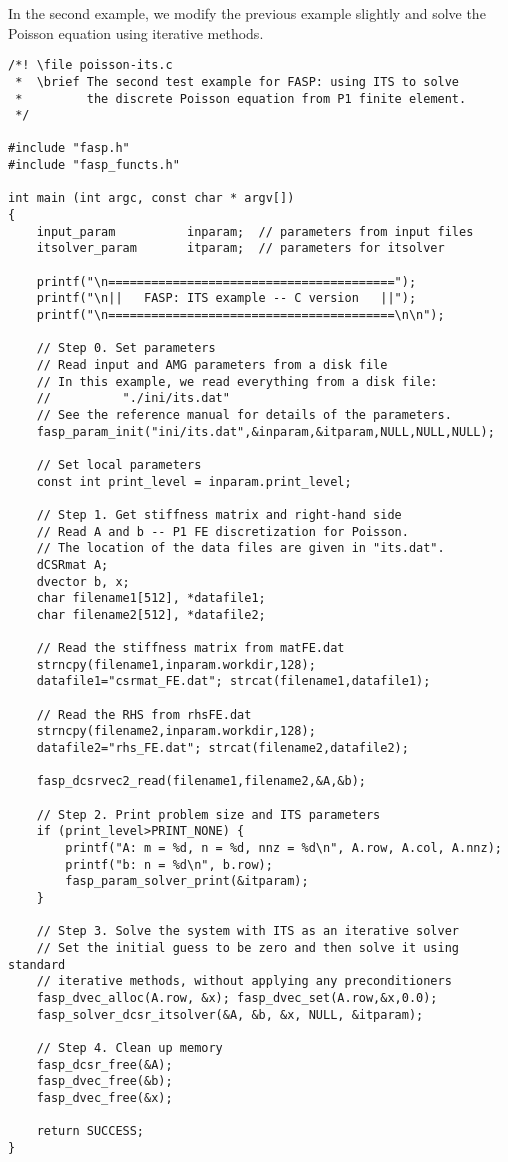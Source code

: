 \documentclass[11pt]{memoir}
\begin{document}
In the second example, we modify the previous example slightly and solve the Poisson equation using iterative methods.

\begin{lstlisting}[stepnumber=1,firstnumber=1]
/*! \file poisson-its.c
 *  \brief The second test example for FASP: using ITS to solve
 *         the discrete Poisson equation from P1 finite element.
 */

#include "fasp.h"
#include "fasp_functs.h"

int main (int argc, const char * argv[])
{
    input_param          inparam;  // parameters from input files
    itsolver_param       itparam;  // parameters for itsolver

    printf("\n========================================");
    printf("\n||   FASP: ITS example -- C version   ||");
    printf("\n========================================\n\n");

    // Step 0. Set parameters
    // Read input and AMG parameters from a disk file
    // In this example, we read everything from a disk file:
    //          "./ini/its.dat"
    // See the reference manual for details of the parameters.
    fasp_param_init("ini/its.dat",&inparam,&itparam,NULL,NULL,NULL);

    // Set local parameters
    const int print_level = inparam.print_level;

    // Step 1. Get stiffness matrix and right-hand side
    // Read A and b -- P1 FE discretization for Poisson.
    // The location of the data files are given in "its.dat".
    dCSRmat A;
    dvector b, x;
    char filename1[512], *datafile1;
    char filename2[512], *datafile2;

    // Read the stiffness matrix from matFE.dat
    strncpy(filename1,inparam.workdir,128);
    datafile1="csrmat_FE.dat"; strcat(filename1,datafile1);

    // Read the RHS from rhsFE.dat
    strncpy(filename2,inparam.workdir,128);
    datafile2="rhs_FE.dat"; strcat(filename2,datafile2);

    fasp_dcsrvec2_read(filename1,filename2,&A,&b);

    // Step 2. Print problem size and ITS parameters
    if (print_level>PRINT_NONE) {
        printf("A: m = %d, n = %d, nnz = %d\n", A.row, A.col, A.nnz);
        printf("b: n = %d\n", b.row);
        fasp_param_solver_print(&itparam);
    }

    // Step 3. Solve the system with ITS as an iterative solver
    // Set the initial guess to be zero and then solve it using standard
    // iterative methods, without applying any preconditioners
    fasp_dvec_alloc(A.row, &x); fasp_dvec_set(A.row,&x,0.0);
    fasp_solver_dcsr_itsolver(&A, &b, &x, NULL, &itparam);

    // Step 4. Clean up memory
    fasp_dcsr_free(&A);
    fasp_dvec_free(&b);
    fasp_dvec_free(&x);

    return SUCCESS;
}
\end{lstlisting}
\end{document}
